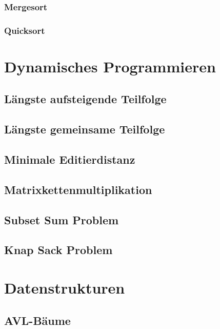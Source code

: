 \documentclass[a4paper]{article}
\begin{document}
    \subsubsection{Mergesort}\label{alg:Mergesort}



    \subsubsection{Quicksort}\label{alg:Quicksort}


\section{Dynamisches Programmieren}

\subsection{Längste aufsteigende Teilfolge}

\subsection{Längste gemeinsame Teilfolge}

\subsection{Minimale Editierdistanz}

\subsection{Matrixkettenmultiplikation}

\subsection{Subset Sum Problem}

\subsection{Knap Sack Problem}

\section{Datenstrukturen}

\subsection{AVL-Bäume}
\end{document}
